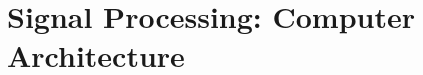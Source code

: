 \documentclass[../course]{subfiles}
\begin{document}
\chapter{Signal Processing: Computer Architecture}


\end{document}
